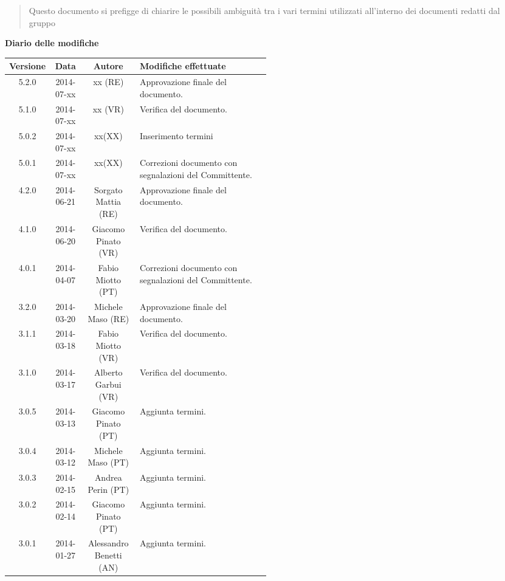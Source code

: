 \begin{abstract}
\begin{center}
Questo documento si prefigge di chiarire le possibili ambiguità tra i vari termini utilizzati all'interno dei documenti redatti dal gruppo \NomeGruppo{}
\end{center}
\end{abstract}

\newpage
\textbf{Diario delle modifiche}
\begin{center}
\begin{longtable}{|c|c|c|p{0.5\linewidth}|}
\toprule
\textbf{Versione} & \textbf{Data} & \textbf{Autore} & \textbf{Modifiche effettuate}\\

\midrule
5.2.0 & 2014-07-xx &  xx (RE) & Approvazione finale del documento.\\

\midrule
5.1.0 & 2014-07-xx &  xx (VR) & Verifica del documento. \\

\midrule
5.0.2 & 2014-07-xx & xx(XX) & Inserimento termini\\

\midrule
5.0.1 & 2014-07-xx & xx(XX) & Correzioni documento con segnalazioni del Committente.\\

\midrule
4.2.0 & 2014-06-21 &  Sorgato Mattia (RE) & Approvazione finale del documento.\\
\midrule
4.1.0 & 2014-06-20 &  Giacomo Pinato (VR) & Verifica del documento. \\

\midrule
4.0.1 & 2014-04-07 & Fabio Miotto (PT) & Correzioni documento con segnalazioni del Committente.\\

\midrule
3.2.0 & 2014-03-20 & Michele Maso (RE) & Approvazione finale del documento.\\
\midrule
3.1.1 & 2014-03-18 & Fabio Miotto (VR) & Verifica del documento. \\
\midrule
3.1.0 & 2014-03-17 & Alberto Garbui (VR) & Verifica del documento. \\
\midrule
3.0.5 & 2014-03-13 & Giacomo Pinato (PT) & Aggiunta termini.\\
\midrule
3.0.4 & 2014-03-12 & Michele Maso (PT) & Aggiunta termini.\\
\midrule
3.0.3 & 2014-02-15 & Andrea Perin (PT) & Aggiunta termini.\\
\midrule
3.0.2 & 2014-02-14 & Giacomo Pinato (PT) & Aggiunta termini.\\
\midrule
3.0.1 & 2014-01-27 & Alessandro Benetti (AN) & Aggiunta termini.\\


\end{longtable}
\end{center}
